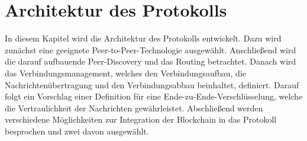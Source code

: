 \chapter{Architektur des Protokolls}
\label{chap:entwurf_und_architektur}

In diesem Kapitel wird die Architektur des Protokolls entwickelt. Dazu wird zunächst eine geeignete Peer-to-Peer-Technologie ausgewählt. Anschließend wird die darauf aufbauende Peer-Discovery und das Routing betrachtet. Danach wird das Verbindungsmanagement, welches den Verbindungsaufbau, die Nachrichtenübertragung und den Verbindungsabbau beinhaltet, definiert. Darauf folgt ein Vorschlag einer Definition für eine Ende-zu-Ende-Verschlüsselung, welche die Vertraulichkeit der Nachrichten gewährleistet. Abschließend werden verschiedene Möglichkeiten zur Integration der Blockchain in das Protokoll besprochen und zwei davon ausgewählt.












